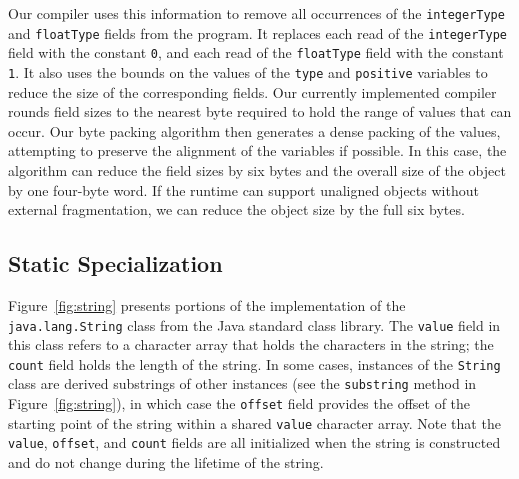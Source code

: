\documentclass{acmconf}
\begin{document}
Our compiler uses this information to remove all occurrences
of the {\tt integerType} and {\tt floatType} fields from the
program. It replaces each read of the {\tt integerType} field
with the constant {\tt 0}, and each read of the {\tt floatType}
field with the constant {\tt 1}. It also uses the bounds on the 
values of the {\tt type} and {\tt positive} variables to reduce the size of the 
corresponding fields. Our currently implemented compiler rounds
field sizes to the nearest byte required to hold the range
of values that can occur. Our byte packing algorithm then 
generates a dense packing of the values, attempting to preserve
the alignment of the variables if possible. In this case, the
algorithm can reduce the field sizes by six bytes and the overall
size of the object by one four-byte word.  If the runtime can support
unaligned objects without external fragmentation, we can reduce the
object size by  the full six bytes.

\subsection{Static Specialization} 

Figure~\ref{fig:string} presents portions of the implementation
of the {\tt java.lang.String} class from the Java standard class
library. The {\tt value} field in this
class refers to a character array that holds the characters
in the string; the {\tt count} field holds the length of the
string. In some cases, instances of the {\tt String} class
are derived substrings of other instances 
(see the {\tt substring} method in Figure~\ref{fig:string}), in
which case the
{\tt offset} field provides the offset of the starting 
point of the string within a shared {\tt value} character array. 
Note that the {\tt value}, {\tt offset}, and {\tt count} 
fields are all initialized when the string is constructed
and do not change during the lifetime of the string.
\end{document}
